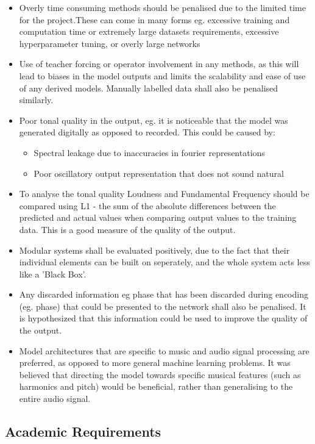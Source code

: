 \begin{itemize}
    \item Overly time consuming methods should be penalised due to the limited time for the project.These can come in many forms eg. excessive training and computation time or extremely large datasets requirements, excessive hyperparameter tuning, or overly large networks
    \item Use of teacher forcing or operator involvement in any methods, as this will lead to biases in the model outputs and limits the scalability and ease of use of any derived models. Manually labelled data shall also be penalised similarly.
    \item Poor tonal quality in the output, eg. it is noticeable that the model was generated digitally as opposed to recorded. This could be caused by:
          \begin{itemize}
              \item Spectral leakage due to inaccuracies in fourier representations
              \item Poor oscillatory output representation that does not sound natural
          \end{itemize}
    \item To analyse the tonal quality Loudness and Fundamental Frequency should be compared using L1 - the sum of the absolute differences between the predicted and actual values when comparing output values to the training data. This is a good measure of the quality of the output.
    \item Modular systems shall be evaluated positively, due to the fact that their individual elements can be built on seperately, and the whole system acts less like a 'Black Box'.
    \item Any discarded information eg phase that has been discarded during encoding (eg. phase) that could be presented to the network shall also be penalised. It is hypothesized that this information could be used to improve the quality of the output.
    \item Model architectures that are specific to music and audio signal processing are preferred, as opposed to more general machine learning problems. It was believed that directing the model towards specific musical features (such as harmonics and pitch) would be beneficial, rather than generalising to the entire audio signal.
\end{itemize}

\subsection{Academic Requirements}

